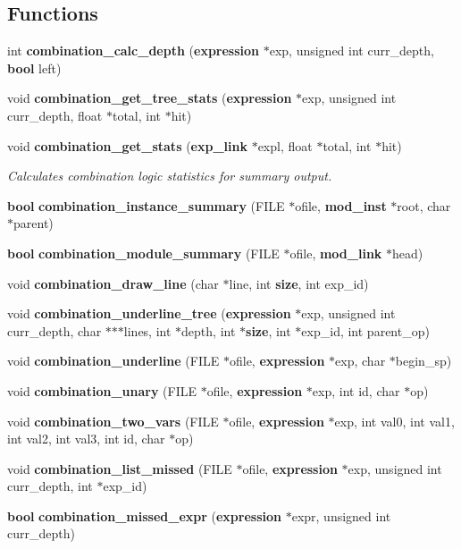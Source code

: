 \subsection*{Functions}
\begin{CompactItemize}
\item 
int {\bf combination\_\-calc\_\-depth} ({\bf expression} $\ast$exp, unsigned int curr\_\-depth, {\bf bool} left)
\item 
void {\bf combination\_\-get\_\-tree\_\-stats} ({\bf expression} $\ast$exp, unsigned int curr\_\-depth, float $\ast$total, int $\ast$hit)
\item 
void {\bf combination\_\-get\_\-stats} ({\bf exp\_\-link} $\ast$expl, float $\ast$total, int $\ast$hit)
\begin{CompactList}\small\item\em Calculates combination logic statistics for summary output.\item\end{CompactList}\item 
{\bf bool} {\bf combination\_\-instance\_\-summary} (FILE $\ast$ofile, {\bf mod\_\-inst} $\ast$root, char $\ast$parent)
\item 
{\bf bool} {\bf combination\_\-module\_\-summary} (FILE $\ast$ofile, {\bf mod\_\-link} $\ast$head)
\item 
void {\bf combination\_\-draw\_\-line} (char $\ast$line, int {\bf size}, int exp\_\-id)
\item 
void {\bf combination\_\-underline\_\-tree} ({\bf expression} $\ast$exp, unsigned int curr\_\-depth, char $\ast$$\ast$$\ast$lines, int $\ast$depth, int $\ast${\bf size}, int $\ast$exp\_\-id, int parent\_\-op)
\item 
void {\bf combination\_\-underline} (FILE $\ast$ofile, {\bf expression} $\ast$exp, char $\ast$begin\_\-sp)
\item 
void {\bf combination\_\-unary} (FILE $\ast$ofile, {\bf expression} $\ast$exp, int id, char $\ast$op)
\item 
void {\bf combination\_\-two\_\-vars} (FILE $\ast$ofile, {\bf expression} $\ast$exp, int val0, int val1, int val2, int val3, int id, char $\ast$op)
\item 
void {\bf combination\_\-list\_\-missed} (FILE $\ast$ofile, {\bf expression} $\ast$exp, unsigned int curr\_\-depth, int $\ast$exp\_\-id)
\item 
{\bf bool} {\bf combination\_\-missed\_\-expr} ({\bf expression} $\ast$expr, unsigned int curr\_\-depth)
\item 

\end{CompactItemize}
